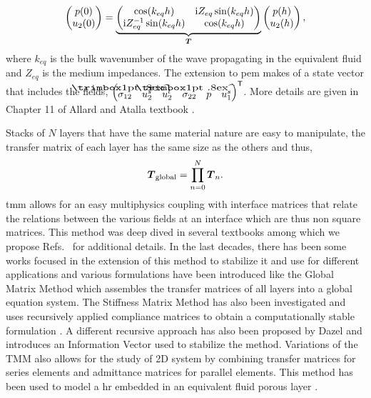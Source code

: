 \begin{equation}
    \begin{pmatrix}
        p(0) \\ u_2(0)
    \end{pmatrix} = 
   \underbrace{ \begin{pmatrix}
        \cos(k_{eq}h) & \mathrm i Z_{eq} \sin(k_{eq}h) \\
        \mathrm i Z_{eq}^{-1} \sin(k_{eq}h) & \cos(k_{eq}h) \\
    \end{pmatrix}}_{\boldsymbol T}
    \begin{pmatrix}
        p(h) \\ u_2(h)
    \end{pmatrix}, 
\end{equation}
where $k_{eq}$ is the bulk wavenumber of the wave propagating in the equivalent fluid and $Z_{eq}$ is the medium impedances. The extension to \acrshort{pem} makes of a state vector that includes the fields, $ \begin{pmatrix} \hat{\sigma}_{12} & u_2^s & u_2^t & \hat{\sigma}_{22} & p & u_1^s \end{pmatrix}^\transp$. More details are given in Chapter 11 of Allard and Atalla textbook \cite{allard2009}.

Stacks of $N$ layers that have the same material nature are easy to manipulate, the transfer matrix of each layer has the same size as the others and thus,
\begin{equation}
\boldsymbol T_{\mathrm{global}} = \prod_{n=0}^N \boldsymbol T_n.
\end{equation}
\acrshort{tmm} allows for an easy multiphysics coupling with interface matrices that relate the relations between the various fields at an interface which are thus non square matrices. This method was deep dived in several textbooks among which we propose Refs.~\cite{allard2009, jimenez2021} for additional details. In the last decades, there has been some works focused in the extension of this method to stabilize it and use for different applications and various formulations have been introduced like the Global Matrix Method \cite{knopoff1964} which assembles the transfer matrices of all layers into a global equation system. The Stiffness Matrix Method has also been investigated and uses recursively applied compliance matrices to obtain a computationally stable formulation \cite{rokhlin2002}. A different recursive approach has also been proposed by Dazel \etal \cite{dazel2013} and introduces an Information Vector used to stabilize the method. Variations of the TMM also allows for the study of 2D system by combining transfer matrices for series elements and admittance matrices for parallel elements. This method has been used to model a \acrfull{hr} embedded in an equivalent fluid porous layer \cite{doutres2015}. 


